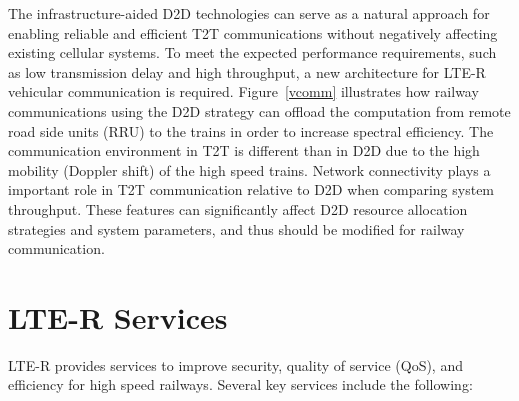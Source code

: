The infrastructure-aided D2D technologies can serve as a natural approach for enabling reliable and efficient T2T communications without negatively affecting existing cellular systems. To meet the expected performance requirements, such as low transmission delay and high throughput, a new architecture for LTE-R vehicular communication is required. Figure~\ref{vcomm} illustrates how railway communications using the D2D strategy can offload the computation from remote road side units (RRU) to the trains in order to increase spectral efficiency. The communication environment in T2T is different than in D2D due to the high mobility (Doppler shift) of the high speed trains. Network connectivity plays a important role in T2T communication relative to D2D when comparing system throughput. These features can significantly affect D2D resource allocation strategies and system parameters, and thus should be modified for railway communication.

\section{LTE-R Services}
LTE-R provides services to improve security, quality of service (QoS), and efficiency for high speed railways. Several key services include the following:



